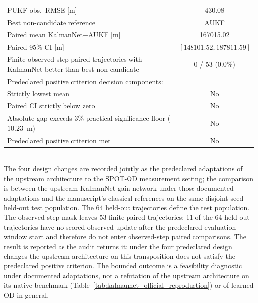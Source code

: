 \begin{table}[t]
{\begin{tabular}{lc}
    PUKF obs.\ RMSE [m] & 430.08 \\
    Best non-candidate reference & AUKF \\
    Paired mean KalmanNet$-$AUKF [m] & 167015.02 \\
    Paired 95\% CI [m] & $[148101.52, 187811.59]$ \\
    Finite observed-step paired trajectories with KalmanNet better than best non-candidate & 0 / 53 (0.0\%) \\
    \midrule
    \multicolumn{2}{l}{Predeclared positive criterion decision components:} \\
    Strictly lowest mean & No \\
    Paired CI strictly below zero & No \\
    Absolute gap exceeds 3\% \mbox{practical-significance} floor ($10.23$~m) & No \\
    Predeclared positive criterion met & No \\
    \bottomrule
  \end{tabular}
  }
  \\[2pt] {\footnotesize The four design changes are recorded jointly as the predeclared adaptations of the upstream architecture to the SPOT-OD measurement setting; the comparison is between the upstream KalmanNet gain network under those documented adaptations and the manuscript's classical references on the same disjoint-seed held-out test population. The 64 held-out trajectories define the test population. The observed-step mask leaves 53 finite paired trajectories: 11 of the 64 held-out trajectories have no scored observed update after the predeclared evaluation-window start and therefore do not enter observed-step paired comparisons. The result is reported as the audit returns it: under the four predeclared design changes the upstream architecture on this transposition does not satisfy the predeclared positive criterion. The bounded outcome is a feasibility diagnostic under documented adaptations, not a refutation of the upstream architecture on its native benchmark (Table~\ref{tab:kalmannet_official_reproduction}) or of learned OD in general.}
\end{table}